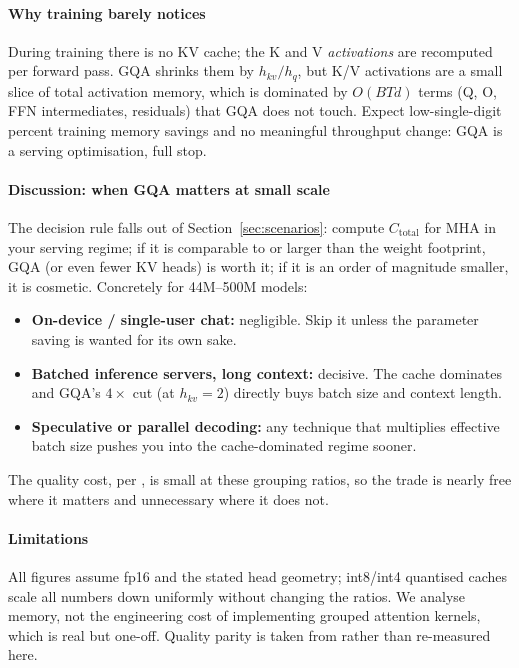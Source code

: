 \paragraph{Why training barely notices}
\label{sec:training}

During training there is no KV cache; the K and V \emph{activations}
are recomputed per forward pass. GQA shrinks them by $h_{kv}/h_q$,
but K/V activations are a small slice of total activation memory,
which is dominated by $O(BTd)$ terms (Q, O, FFN intermediates,
residuals) that GQA does not touch. Expect low-single-digit percent
training memory savings and no meaningful throughput change: GQA is
a serving optimisation, full stop.

\paragraph{Discussion: when GQA matters at small scale}

The decision rule falls out of Section~\ref{sec:scenarios}:
compute $C_{\mathrm{total}}$ for MHA in your serving regime; if it
is comparable to or larger than the weight footprint, GQA (or even
fewer KV heads) is worth it; if it is an order of magnitude
smaller, it is cosmetic. Concretely for 44M--500M models:
\begin{itemize}
  \item \textbf{On-device / single-user chat:} negligible. Skip it
    unless the parameter saving is wanted for its own sake.
  \item \textbf{Batched inference servers, long context:}
    decisive. The cache dominates and GQA's $4\times$ cut (at
    $h_{kv} = 2$) directly buys batch size and context length.
  \item \textbf{Speculative or parallel decoding:} any technique
    that multiplies effective batch size pushes you into the
    cache-dominated regime sooner.
\end{itemize}
The quality cost, per \citet{ainslie2023gqa}, is small at these
grouping ratios, so the trade is nearly free where it matters and
unnecessary where it does not.

\paragraph{Limitations}

All figures assume fp16 and the stated head geometry; int8/int4
quantised caches scale all numbers down uniformly without changing
the ratios. We analyse memory, not the engineering cost of
implementing grouped attention kernels, which is real but
one-off. Quality parity is taken from \citet{ainslie2023gqa}
rather than re-measured here.

